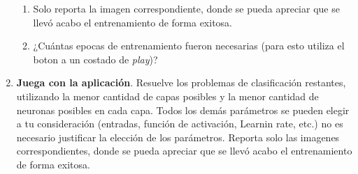 \documentclass[10pt]{article}
\begin{document}
\begin{enumerate}
\begin{enumerate}[noitemsep,topsep=\mdcompacttopsep,label=\alph*.]%

\item{}Solo reporta la imagen correspondiente, donde se pueda apreciar 
que se llevó acabo el entrenamiento de forma exitosa.%

\item{}¿Cuántas epocas de entrenamiento fueron necesarias (para esto utiliza el boton a un costado de \emph{play})?%
\end{enumerate}%

\item{}
\textbf{Juega con la aplicación}. Resuelve los problemas de clasificación restantes, utilizando la menor cantidad de capas posibles y
la menor cantidad de neuronas posibles en cada capa.
Todos los demás parámetros se pueden elegir a tu consideración 
(entradas, función de activación, Learnin rate, etc.) no es necesario justificar la elección de los parámetros.
Reporta solo las imagenes correspondientes, donde se pueda apreciar 
que se llevó acabo el entrenamiento de forma exitosa.%
\end{enumerate}%
\end{document}
